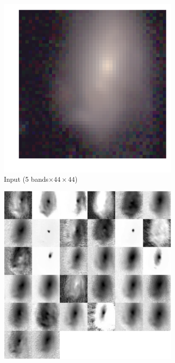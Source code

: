 \documentclass[fleqn,usenatbib]{mnras}
\begin{document}
\begin{figure}
  \centering
  \begin{subfigure}[c]{0.24\linewidth}
  \centering
    \includegraphics[width=\textwidth]{figures/galaxy_original.pdf}
    \caption{Input (5 bands$\times44\times44$)}
  \end{subfigure}
  \hfill
  \begin{subfigure}[c]{0.24\linewidth}
  \centering
    \includegraphics[width=\textwidth]{figures/galaxy_conv11.pdf}

\end{subfigure}
\end{figure}
\end{document}
